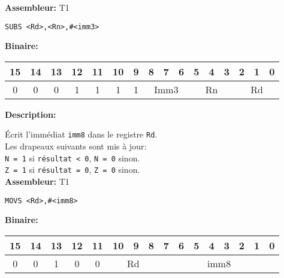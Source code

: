\documentclass{article}
\begin{document}
    \textbf{Assembleur:} T1

    \begin{lstlisting}
SUBS <Rd>,<Rn>,#<imm3>
    \end{lstlisting}

    \textbf{Binaire:}

    \begin{tabular}{| c c c c c c c c c c c c c c c c |}
        \hline
        15 & 14 & 13 & \multicolumn{1}{|c}{12} & 11 & \multicolumn{1}{|c}{10} & \multicolumn{1}{|c}{9} & \multicolumn{1}{|c}{8} & 7 & 6 & \multicolumn{1}{|c}{5} & 4 & 3 & \multicolumn{1}{|c}{2} & 1 & 0 \\
        \hline
        0 & 0 & 0 & \multicolumn{1}{|c}{1} & 1 & \multicolumn{1}{|c}{1} & \multicolumn{1}{|c}{1} & \multicolumn{3}{|c|}{Imm3} & \multicolumn{3}{|c|}{Rn} & \multicolumn{3}{|c|}{Rd} \\
        \hline
    \end{tabular}



    \textbf{Description: }

    Écrit l'immédiat \texttt{imm8} dans le registre \texttt{Rd}.\\
    Les drapeaux suivants sont mis à jour:\\
    \texttt{N = 1} si \texttt{résultat < 0}, \texttt{N = 0} sinon.\\
    \texttt{Z = 1} si \texttt{résultat = 0}, \texttt{Z = 0} sinon.\\

    \textbf{Assembleur:} T1

    \begin{lstlisting}
MOVS <Rd>,#<imm8>
    \end{lstlisting}

    \textbf{Binaire:}

    \begin{tabular}{| c c c c c c c c c c c c c c c c |}
        \hline
        15 & 14 & 13 & \multicolumn{1}{|c}{12} & 11 & \multicolumn{1}{|c}{10} & 9 & 8 & \multicolumn{1}{|c}{7} & 6 & 5 & 4 & 3 & 2 & 1 & 0 \\
        \hline
        0 & 0 & 1 & \multicolumn{1}{|c}{0} & 0 & \multicolumn{3}{|c|}{Rd} & \multicolumn{8}{|c|}{imm8} \\
        \hline
    \end{tabular}
    
\end{document}
